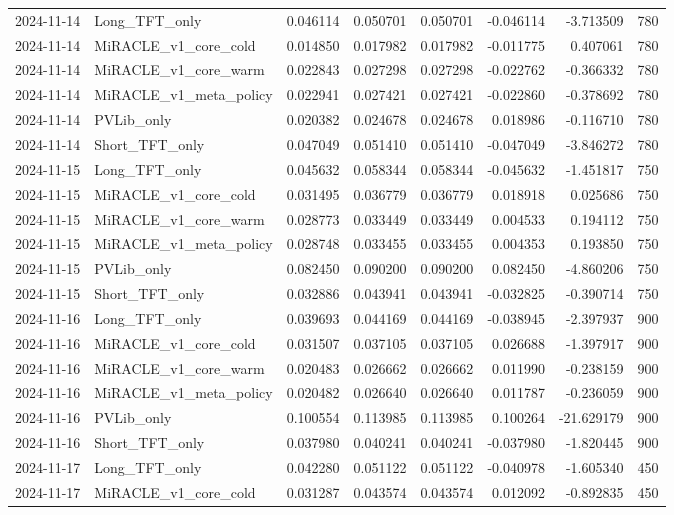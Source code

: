 \begin{tabular}{llrrrrrr}
2024-11-14 & Long_TFT_only & 0.046114 & 0.050701 & 0.050701 & -0.046114 & -3.713509 & 780 \\
2024-11-14 & MiRACLE_v1_core_cold & 0.014850 & 0.017982 & 0.017982 & -0.011775 & 0.407061 & 780 \\
2024-11-14 & MiRACLE_v1_core_warm & 0.022843 & 0.027298 & 0.027298 & -0.022762 & -0.366332 & 780 \\
2024-11-14 & MiRACLE_v1_meta_policy & 0.022941 & 0.027421 & 0.027421 & -0.022860 & -0.378692 & 780 \\
2024-11-14 & PVLib_only & 0.020382 & 0.024678 & 0.024678 & 0.018986 & -0.116710 & 780 \\
2024-11-14 & Short_TFT_only & 0.047049 & 0.051410 & 0.051410 & -0.047049 & -3.846272 & 780 \\
2024-11-15 & Long_TFT_only & 0.045632 & 0.058344 & 0.058344 & -0.045632 & -1.451817 & 750 \\
2024-11-15 & MiRACLE_v1_core_cold & 0.031495 & 0.036779 & 0.036779 & 0.018918 & 0.025686 & 750 \\
2024-11-15 & MiRACLE_v1_core_warm & 0.028773 & 0.033449 & 0.033449 & 0.004533 & 0.194112 & 750 \\
2024-11-15 & MiRACLE_v1_meta_policy & 0.028748 & 0.033455 & 0.033455 & 0.004353 & 0.193850 & 750 \\
2024-11-15 & PVLib_only & 0.082450 & 0.090200 & 0.090200 & 0.082450 & -4.860206 & 750 \\
2024-11-15 & Short_TFT_only & 0.032886 & 0.043941 & 0.043941 & -0.032825 & -0.390714 & 750 \\
2024-11-16 & Long_TFT_only & 0.039693 & 0.044169 & 0.044169 & -0.038945 & -2.397937 & 900 \\
2024-11-16 & MiRACLE_v1_core_cold & 0.031507 & 0.037105 & 0.037105 & 0.026688 & -1.397917 & 900 \\
2024-11-16 & MiRACLE_v1_core_warm & 0.020483 & 0.026662 & 0.026662 & 0.011990 & -0.238159 & 900 \\
2024-11-16 & MiRACLE_v1_meta_policy & 0.020482 & 0.026640 & 0.026640 & 0.011787 & -0.236059 & 900 \\
2024-11-16 & PVLib_only & 0.100554 & 0.113985 & 0.113985 & 0.100264 & -21.629179 & 900 \\
2024-11-16 & Short_TFT_only & 0.037980 & 0.040241 & 0.040241 & -0.037980 & -1.820445 & 900 \\
2024-11-17 & Long_TFT_only & 0.042280 & 0.051122 & 0.051122 & -0.040978 & -1.605340 & 450 \\
2024-11-17 & MiRACLE_v1_core_cold & 0.031287 & 0.043574 & 0.043574 & 0.012092 & -0.892835 & 450 \\

\end{tabular}
